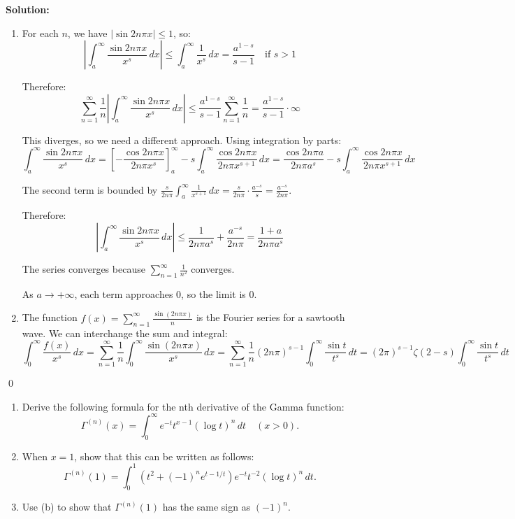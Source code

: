 \bigskip\noindent\textbf{Solution:}
\begin{enumerate}[label=(\alph*)]
    \item For each $n$, we have $|\sin 2n\pi x| \leq 1$, so:
    \[\left|\int_{a}^{\infty} \frac{\sin 2n\pi x}{x^{s}} \, dx\right| \leq \int_{a}^{\infty} \frac{1}{x^{s}} \, dx = \frac{a^{1-s}}{s-1} \quad \text{if } s > 1\]
    
    Therefore:
    \[\sum_{n=1}^{\infty} \frac{1}{n} \left|\int_{a}^{\infty} \frac{\sin 2n\pi x}{x^{s}} \, dx\right| \leq \frac{a^{1-s}}{s-1} \sum_{n=1}^{\infty} \frac{1}{n} = \frac{a^{1-s}}{s-1} \cdot \infty\]
    
    This diverges, so we need a different approach. Using integration by parts:
    \[\int_{a}^{\infty} \frac{\sin 2n\pi x}{x^{s}} \, dx = \left[-\frac{\cos 2n\pi x}{2n\pi x^{s}}\right]_{a}^{\infty} - s \int_{a}^{\infty} \frac{\cos 2n\pi x}{2n\pi x^{s+1}} \, dx = \frac{\cos 2n\pi a}{2n\pi a^{s}} - s \int_{a}^{\infty} \frac{\cos 2n\pi x}{2n\pi x^{s+1}} \, dx\]
    
    The second term is bounded by $\frac{s}{2n\pi} \int_{a}^{\infty} \frac{1}{x^{s+1}} \, dx = \frac{s}{2n\pi} \cdot \frac{a^{-s}}{s} = \frac{a^{-s}}{2n\pi}$.
    
    Therefore:
    \[\left|\int_{a}^{\infty} \frac{\sin 2n\pi x}{x^{s}} \, dx\right| \leq \frac{1}{2n\pi a^{s}} + \frac{a^{-s}}{2n\pi} = \frac{1 + a}{2n\pi a^{s}}\]
    
    The series converges because $\sum_{n=1}^{\infty} \frac{1}{n^2}$ converges.
    
    As $a \to +\infty$, each term approaches 0, so the limit is 0.
    
    \item The function $f(x) = \sum_{n=1}^{\infty} \frac{\sin(2n\pi x)}{n}$ is the Fourier series for a sawtooth wave. We can interchange the sum and integral:
    \[\int_{0}^{\infty} \frac{f(x)}{x^{s}} \, dx = \sum_{n=1}^{\infty} \frac{1}{n} \int_{0}^{\infty} \frac{\sin(2n\pi x)}{x^{s}} \, dx = \sum_{n=1}^{\infty} \frac{1}{n} (2n\pi)^{s-1} \int_{0}^{\infty} \frac{\sin t}{t^{s}} \, dt = (2\pi)^{s-1} \zeta(2-s) \int_{0}^{\infty} \frac{\sin t}{t^{s}} \, dt\]
\end{enumerate}\qed


\begin{problembox}
\begin{enumerate}[label=(\alph*)]
    \item Derive the following formula for the nth derivative of the Gamma function:
    \[\Gamma^{(n)}(x) = \int_{0}^{\infty} e^{-t} t^{x-1} (\log t)^{n} \, dt \quad (x > 0).\]
    \item When $x = 1$, show that this can be written as follows:
    \[\Gamma^{(n)}(1) = \int_{0}^{1} (t^{2} + (-1)^{n} e^{t-1/t}) e^{-t} t^{-2} (\log t)^{n} \, dt.\]
    \item Use (b) to show that $\Gamma^{(n)}(1)$ has the same sign as $(-1)^{n}$.
\end{enumerate}
\end{problembox}

